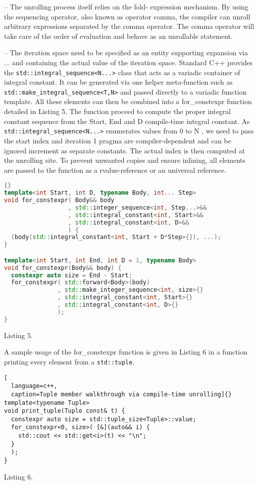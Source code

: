 \documentclass[../../main.tex]{subfiles}
\begin{document}
– The unrolling process itself relies on the fold-
expression mechanism. By using the sequencing
operator, also known as operator comma, the
compiler can unroll arbitrary expressions separated
by the comma operator. The comma operator will
take care of the order of evaluation and behave as
an unrollable statement.

– The iteration space need to be specified
as an entity supporting expansion via ...
and containing the actual value of the
iteration space. Standard C++ provides the
\lstinline{std::integral_sequence<N...>} class that
acts as a variadic container of integral constant. It
can be generated via one helper meta-function such
as \lstinline{std::make_integral_sequence<T,N>}
and passed directly to a variadic function template.
All these elements can then be combined into a
for_constexpr function detailed in Listing 5.
The function proceed to compute the proper
integral constant sequence from the Start,
End and D compile-time integral constant. As
\lstinline{std::integral_sequence<N...>} enumerates values
from 0 to N , we need to pass the start index and iteration
1 pragma are compiler-dependent and can be ignored
increment as separate constants. The actual index is then
computed at the unrolling site. To prevent unwanted copies
and ensure inlining, all elements are passed to the function
as a rvalue-reference or an universal reference.

\begin{lstlisting}[language=c++, caption=Compile-time unroller]{}
template<int Start, int D, typename Body, int... Step>
void for_constexpr( Body&& body
                  , std::integer_sequence<int, Step...>&&
                  , std::integral_constant<int, Start>&&
                  , std::integral_constant<int, D>&&
                  ) {
  (body(std::integral_constant<int, Start + D*Step>{}), ...);
}

template<int Start, int End, int D = 1, typename Body>
void for_constexpr(Body&& body) {
  constexpr auto size = End - Start;
  for_constexpr( std::forward<Body>(body)
               , std::make_integer_sequence<int, size>{}
               , std::integral_constant<int, Start>{}
               , std::integral_constant<int, D>{}
               );
}
\end{lstlisting}
Listing 5.

A sample usage of the for_constexpr function is given
in Listing 6 in a function printing every element from a
\lstinline{std::tuple}.

\begin{lstlisting}[
  language=c++,
  caption=Tuple member walkthrough via compile-time unrolling]{}
template<typename Tuple>
void print_tuple(Tuple const& t) {
  constexpr auto size = std::tuple_size<Tuple>::value;
  for_constexpr<0, size>( [&](auto&& i) {
    std::cout << std::get<i>(t) << "\n";
  }
  );
}
\end{lstlisting}
Listing 6.
\end{document}
